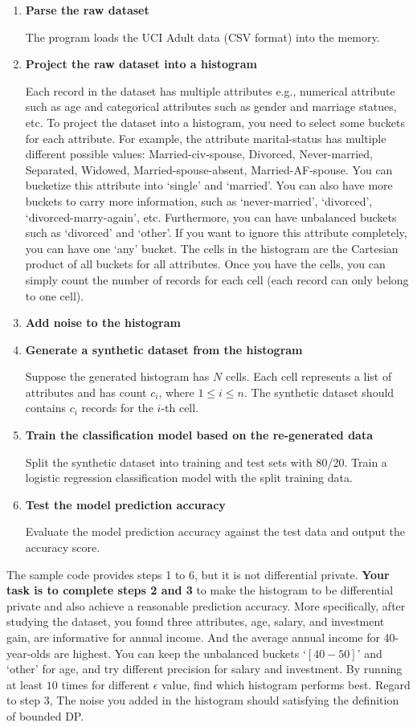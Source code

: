\documentclass{article}
\begin{document}
\begin{enumerate}
    \item \textbf{Parse the raw dataset}\par
        The program loads the UCI Adult data (CSV format) into the memory.
    \item \textbf{Project the raw dataset into a histogram} \par
        Each record in the dataset has multiple attributes e.g., numerical attribute such as age and categorical attributes such as gender and marriage statues, etc.  To project the dataset into a histogram, you need to select some buckets for each attribute.  For example, the attribute marital-status has multiple different possible values: Married-civ-spouse, Divorced, Never-married, Separated, Widowed, Married-spouse-absent, Married-AF-spouse.  You can bucketize this attribute into `single' and `married'.  You can also have more buckets to carry more information, such as `never-married', `divorced', `divorced-marry-again', etc.  Furthermore, you can have unbalanced buckets such as `divorced' and `other'.  If you want to ignore this attribute completely, you can have one `any' bucket.  The cells in the histogram are the Cartesian product of all buckets for all attributes.  Once you have the cells, you can simply count the number of records for each cell (each record can only belong to one cell).
    \item \textbf{Add noise to the histogram}
    \item \textbf{Generate a synthetic dataset from the histogram}\par
        Suppose the generated histogram has $N$ cells. Each cell represents a list of attributes and has count $c_i$, where $1\leq i \leq n$. The synthetic dataset should contains $c_i$ records for the $i$-th cell.
    \item \textbf{Train the classification model based on the re-generated data}\par
        Split the synthetic dataset into training and test sets with 80/20. Train a logistic regression classification model with the split training data.
    \item \textbf{Test the model prediction accuracy}\par
        Evaluate the model prediction accuracy against the test data and output the accuracy score.
\end{enumerate}

The sample code provides steps 1 to 6, but it is not differential private. \textbf{Your task is to complete steps 2 and 3} to make the histogram to be differential private and also achieve a reasonable prediction accuracy. More specifically, after studying the dataset, you found three attributes, age, salary, and investment gain, are informative for annual income. And the average annual income for 40-year-olds are highest. You can keep the unbalanced buckets `$[40-50]$' and `other' for age, and try different precision for salary and investment. By running at least $10$ times for different $\epsilon$ value, find which histogram performs best. Regard to step 3, The noise you added in the histogram should satisfying the definition of bounded DP. 
\end{document}
